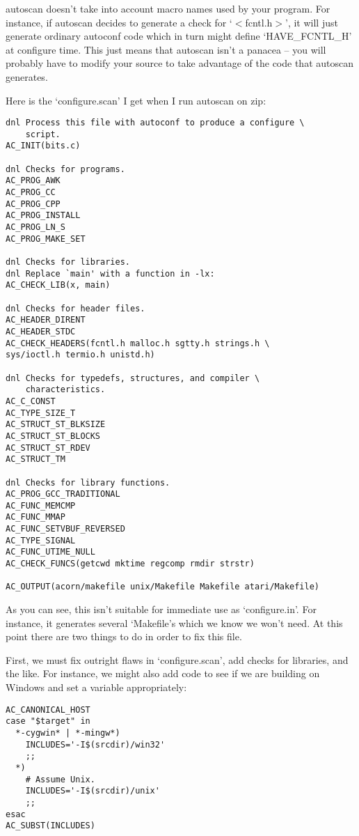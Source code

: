autoscan doesn't take into account macro names used by your program. For 
instance, if autoscan decides to generate a check for `$<$fcntl.h$>$', it 
will just generate ordinary autoconf code which in turn might 
define `HAVE\_{}FCNTL\_{}H' at configure time. This just means that 
autoscan isn't a panacea -- you will probably have to modify your source 
to take advantage of the code that autoscan generates.

Here is the `configure.scan' I get when I run autoscan on zip:

\begin{Verbatim}[frame=single]
dnl Process this file with autoconf to produce a configure \
    script.
AC_INIT(bits.c)

dnl Checks for programs.
AC_PROG_AWK
AC_PROG_CC
AC_PROG_CPP
AC_PROG_INSTALL
AC_PROG_LN_S
AC_PROG_MAKE_SET

dnl Checks for libraries.
dnl Replace `main' with a function in -lx:
AC_CHECK_LIB(x, main)

dnl Checks for header files.
AC_HEADER_DIRENT
AC_HEADER_STDC
AC_CHECK_HEADERS(fcntl.h malloc.h sgtty.h strings.h \
sys/ioctl.h termio.h unistd.h)

dnl Checks for typedefs, structures, and compiler \
    characteristics.
AC_C_CONST
AC_TYPE_SIZE_T
AC_STRUCT_ST_BLKSIZE
AC_STRUCT_ST_BLOCKS
AC_STRUCT_ST_RDEV
AC_STRUCT_TM

dnl Checks for library functions.
AC_PROG_GCC_TRADITIONAL
AC_FUNC_MEMCMP
AC_FUNC_MMAP
AC_FUNC_SETVBUF_REVERSED
AC_TYPE_SIGNAL
AC_FUNC_UTIME_NULL
AC_CHECK_FUNCS(getcwd mktime regcomp rmdir strstr)

AC_OUTPUT(acorn/makefile unix/Makefile Makefile atari/Makefile)
\end{Verbatim}

As you can see, this isn't suitable for immediate use as `configure.in'. For instance, it generates several `Makefile's which we know we won't need. At this point there are two things to do in order to fix this file.

First, we must fix outright flaws in `configure.scan', add checks for libraries, and the like. For instance, we might also add code to see if we are building on Windows and set a variable appropriately: 

\begin{Verbatim}[frame=single]
AC_CANONICAL_HOST
case "$target" in
  *-cygwin* | *-mingw*)
    INCLUDES='-I$(srcdir)/win32'
    ;;
  *)
    # Assume Unix.
    INCLUDES='-I$(srcdir)/unix'
    ;;
esac
AC_SUBST(INCLUDES)
\end{Verbatim}

